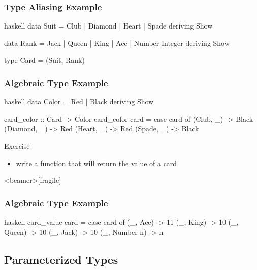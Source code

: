 \documentclass[dvipsnames]{beamer}
\theoremstyle{plain}
\begin{document}
\begin{frame}[fragile]
  \frametitle{Type Aliasing Example}

  \begin{example}
    \begin{pygments}{haskell}
data Suit = Club | Diamond | Heart | Spade
            deriving Show

data Rank = Jack | Queen | King | Ace | Number Integer
            deriving Show

type Card = (Suit, Rank)
    \end{pygments}
  \end{example}
\end{frame}

\begin{frame}[fragile]
  \frametitle{Algebraic Type Example}

  \begin{example}
    \pause
    \begin{pygments}{haskell}
data Color = Red | Black
             deriving Show

card_color :: Card -> Color
card_color card =
    case card of
      (Club, _) -> Black
      (Diamond, _) -> Red
      (Heart, _) -> Red
      (Spade, _) -> Black
    \end{pygments}
  \end{example}

  \pause
  \begin{block}{Exercise}
    \begin{itemize}
      \item write a function that will return the value of a card
    \end{itemize}
  \end{block}
\end{frame}

\begin{frame}<beamer>[fragile]
  \frametitle{Algebraic Type Example}

  \begin{example}
    \begin{pygments}{haskell}
card_value card =
    case card of
      (_, Ace) -> 11
      (_, King) -> 10
      (_, Queen) -> 10
      (_, Jack) -> 10
      (_, Number n) -> n
    \end{pygments}
  \end{example}
\end{frame}

\subsection{Parameterized Types}
\end{document}

